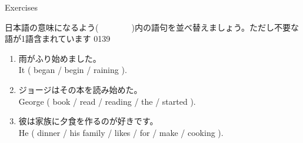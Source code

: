 \documentclass[aspectratio=169,xcolor={dvipsnames,table}]{beamer}
\begin{document}
\begin{frame}[plain]{Exercises}

{\small 日本語の意味になるよう(~~~~~~~~)内の語句を並べ替えましょう。ただし不要な語が1語含まれています}%
\hfill{\tiny 0139}\,{\scriptsize {}}
\begin{enumerate}
 \item {\small 雨がふり始めました。}\\
       It ( began / begin / raining ).\\
 \item {\small ジョージはその本を読み始めた。}\\
       George ( book / read / reading / the / started ).\\
 \item {\small 彼は家族に夕食を作るのが好きです。}\\
       He ( dinner / his family / likes / for / make / cooking ).\\
\end{enumerate}
\end{frame}
\end{document}
